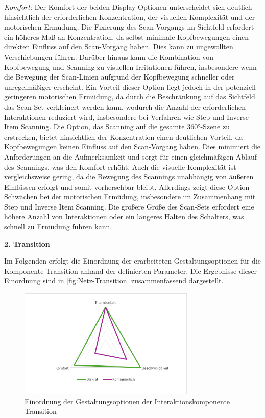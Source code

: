 \textit{Komfort:}
Der Komfort der beiden Display-Optionen unterscheidet sich deutlich hinsichtlich der erforderlichen Konzentration, der visuellen Komplexität und der motorischen Ermüdung.
Die Fixierung des Scan-Vorgangs im Sichtfeld erfordert ein höheres Maß an Konzentration, da selbst minimale Kopfbewegungen einen direkten Einfluss auf den Scan-Vorgang haben. Dies kann zu ungewollten Verschiebungen führen. Darüber hinaus kann die Kombination von Kopfbewegung und Scanning zu visuellen Irritationen führen, insbesondere wenn die Bewegung der Scan-Linien aufgrund der Kopfbewegung schneller oder unregelmäßiger erscheint. Ein Vorteil dieser Option liegt jedoch in der potenziell geringeren motorischen Ermüdung, da durch die Beschränkung auf das Sichtfeld das Scan-Set verkleinert werden kann, wodurch die Anzahl der erforderlichen Interaktionen reduziert wird, insbesondere bei Verfahren wie Step und Inverse Item Scanning. 
Die Option, das Scanning auf die gesamte 360°-Szene zu erstrecken, bietet hinsichtlich der Konzentration einen deutlichen Vorteil, da Kopfbewegungen keinen Einfluss auf den Scan-Vorgang haben. Dies minimiert die Anforderungen an die Aufmerksamkeit und sorgt für einen gleichmäßigen Ablauf des Scannings, was den Komfort erhöht. Auch die visuelle Komplexität ist vergleichsweise gering, da die Bewegung des Scannings unabhängig von äußeren Einflüssen erfolgt und somit vorhersehbar bleibt. Allerdings zeigt diese Option Schwächen bei der motorischen Ermüdung, insbesondere im Zusammenhang mit Step und Inverse Item Scanning. Die größere Größe des Scan-Sets erfordert eine höhere Anzahl von Interaktionen oder ein längeres Halten des Schalters, was schnell zu Ermüdung führen kann. 

\textbf{2. Transition} 

Im Folgenden erfolgt die Einordnung der erarbeiteten Gestaltungsoptionen für die Komponente Transition anhand der definierten Parameter. Die Ergebnisse dieser Einordnung sind in \autoref{fig:Netz-Transition} zusammenfassend dargestellt. 

\begin{figure}[tbh]
    \centering
    \includegraphics[width=0.75\textwidth]{images/Netzdiagramm-Transition.png}
    \caption{Einordnung der Gestaltungsoptionen der Interaktionskomponente Transition}
    \label{fig:Netz-Transition}
\end{figure}

